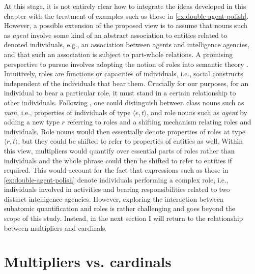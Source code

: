 At this stage, it is not entirely clear how to integrate the ideas developed in this chapter with the treatment of examples such as those in \ref{ex:double-agent-polish}. However, a possible extension of the proposed view is to assume that nouns such as \textit{agent} involve some kind of an abstract association to entities related to denoted individuals, e.g., an association between agents and intelligence agencies, and that such an association is subject to part-whole relations. A promising perspective to pursue involves adopting the notion of roles into semantic theory \citep[see][]{sowa1984conceptual,steimann2000representation,zobel2017sensitivity,wagiel-toappear-slavic}. Intuitively, roles are functions or capacities of individuals, i.e., social constructs independent of the individuals that bear them. Crucially for our purposes, for an individual to bear a particular role, it must stand in a certain relationship to other individuals. Following \citet{zobel2017sensitivity}, one could distinguish between class nouns such as \textit{man}, i.e., properties of individuals of type $\langle e,t\rangle$, and role nouns such as \textit{agent} by adding a new type $r$ referring to roles and a shifting mechanism relating roles and individuals. Role nouns would then essentially denote properties of roles at type $\langle r,t\rangle$, but they could be shifted to refer to properties of entities as well. Within this view, multipliers would quantify over essential parts of roles rather than individuals and the whole phrase could then be shifted to refer to entities if required. This would account for the fact that expressions such as those in \ref{ex:double-agent-polish} denote individuals performing a complex role, i.e., individuals involved in activities and bearing responsibilities related to two distinct intelligence agencies. However, exploring the interaction between subatomic quantification and roles is rather challenging and goes beyond the scope of this study. Instead, in the next section I will return to the relationship between multipliers and cardinals.

\section{Multipliers vs. cardinals}\label{sec:multipliers-vs-cardinals}

